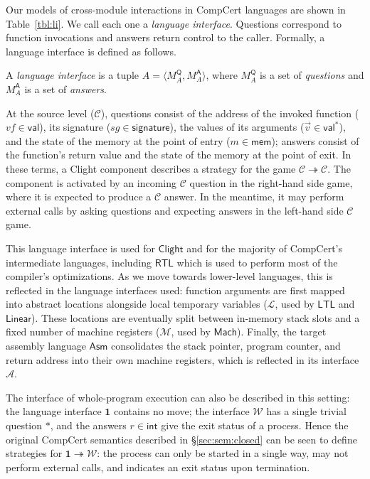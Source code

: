 \documentclass[sigplan,10pt,review,anonymous]{acmart}
\newcommand{\kw}[1]{\ensuremath{ \mathsf{#1} }}
\begin{document}
Our models of cross-module interactions in CompCert languages
are shown in Table~\ref{tbl:li}.
We call each one a \emph{language interface}.
Questions correspond to function invocations
and answers return control to the caller.
Formally,
a language interface is defined as follows.

\begin{definition}
A \emph{language interface} is a tuple
$A = \langle M_A^\kw{Q}, M_A^\kw{A} \rangle$, where
$M_A^\kw{Q}$ is a set of \emph{questions} and
$M_A^\kw{A}$ is a set of \emph{answers}.
\end{definition}

At the source level ($\mathcal{C}$),
questions consist of
the address of the invoked function
($\mathit{vf} \in \kw{val}$),
its signature
($\mathit{sg} \in \kw{signature}$),
the values of its arguments
($\vec{v} \in \kw{val}^*$),
and the state of the memory at the point of entry
($m \in \kw{mem}$);
answers
consist of the function's return value
and the state of the memory at the point of exit.
In these terms,
a Clight component describes a strategy for the game
$\mathcal{C} \twoheadrightarrow \mathcal{C}$.
The component is activated by an incoming $\mathcal{C}$ question
in the right-hand side game,
where it is expected to produce a $\mathcal{C}$ answer.
In the meantime,
it may perform external calls by
asking questions and expecting answers
in the left-hand side $\mathcal{C}$ game.

This language interface is used for \kw{Clight} and
for the majority of CompCert's intermediate languages,
including \kw{RTL} which is used to perform
most of the compiler's optimizations.
As we move towards lower-level languages,
this is reflected in the language interfaces used:
function arguments are first mapped into
abstract locations alongside local temporary variables
($\mathcal{L}$, used by \kw{LTL} and \kw{Linear}).
These locations are eventually split between
in-memory stack slots and a fixed number of machine registers
($\mathcal{M}$, used by \kw{Mach}).
Finally, the target assembly language \kw{Asm}
consolidates the stack pointer, program counter,
and return address into their own machine registers,
which is reflected in its interface $\mathcal{A}$.

The interface of whole-program execution
can also be described in this setting:
the language interface $\mathbf{1}$ contains no move;
the interface $\mathcal{W}$ has a single trivial question $*$,
and the answers $r \in \kw{int}$
give the exit status of a process.
Hence the original CompCert semantics described in
\S\ref{sec:sem:closed}
can be seen to define strategies for
$\mathbf{1} \twoheadrightarrow \mathcal{W}$:
the process can only be started in a single way,
may not perform external calls,
and indicates an exit status upon termination.
\end{document}
